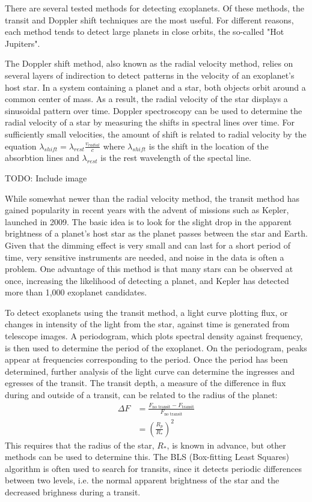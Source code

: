There are several tested methods for detecting exoplanets. Of these methods, the transit and Doppler
shift techniques are the most useful. For different reasons, each method tends to detect large planets
in close orbits, the so-called "Hot Jupiters".

The Doppler shift method, also known as the radial velocity method, relies on several layers of indirection
to detect patterns in the velocity of an exoplanet's host star. In a system containing a planet and a star,
both objects orbit around a common center of mass.\autocite{jplMethods} As a result, the radial velocity
of the star displays a sinusoidal pattern over time. Doppler spectroscopy can be used to determine the radial
velocity of a star by measuring the shifts in spectral lines over time. For sufficiently small velocities,
the amount of shift is related to radial velocity by the equation
\( \lambda_{shift} = \lambda_{rest} \frac{v_{radial}}{c} \)
where \(\lambda_{shift}\) is the shift in the location of the absorbtion lines and
\(\lambda_{rest}\) is the rest wavelength of the spectal line.\autocite{dopplerSpectroscopy}

TODO: Include image

While somewhat newer than the radial velocity method, the transit method has gained popularity in recent years
with the advent of missions such as Kepler, launched in 2009. The basic idea is to look for the slight drop
in the apparent brightness of a planet's host star as the planet passes between the star and Earth. Given that the
dimming effect is very small and can last for a short period of time, very sensitive instruments are needed,
and noise in the data is often a problem.\autocite{jplMethods} One advantage of this method is that
many stars can be observed at once, increasing the likelihood of detecting a planet, and Kepler
has detected more than 1,000 exoplanet candidates.\autocite{jplMethods}

To detect exoplanets using the transit method, a light curve plotting flux, or changes in intensity of the
light from the star, against time is generated from telescope images. A periodogram, which plots spectral density against frequency,
is then used to determine the period of the exoplanet. On the periodogram, peaks appear at frequencies corresponding
to the period. Once the period has been determined, further analysis of the light curve can determine the ingresses
and egresses of the transit. The transit depth, a measure of the difference in flux during and outside of a transit,
can be related to the radius of the planet:
\begin{align*}
	\Delta F &= \frac{ F_{\text{no transit}} - F_{\text{transit}} }{ F_{\text{no transit}} } \\
	&= (\frac{R_p}{R_*})^2
\end{align*}
This requires that the radius of the star, \(R_*\), is known in advance, but other methods can be used to determine this.
The BLS (Box-fitting Least Squares) algorithm is often used to search for transits, since it detects periodic differences
between two levels, i.e. the normal apparent brightness of the star and the decreased brighness during a transit.\autocite{bls}

